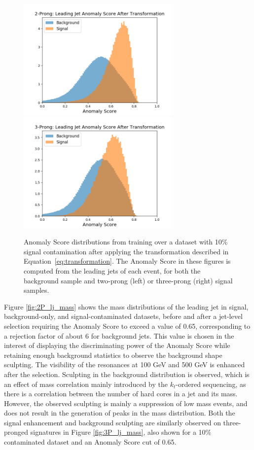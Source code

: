 \documentclass[12pt, a4paper]{article}
\begin{document}
\begin{figure}[H]
	\begin{center}
		\includegraphics[width=225pt]{imgs/bugfix/2Prong_Contaminated_10p0_J_Score_Multi_Lead_SaveForPaper.png}
		\includegraphics[width=225pt]{imgs/bugfix/3Prong_Contaminated_10p0_J_Score_Multi_Lead_SaveForPaper.png}
	\end{center}

	\caption{Anomaly Score distributions from training over a dataset with 10\% signal contamination after applying the transformation described in Equation~\ref{eq:transformation}. The Anomaly Score in these figures is computed from the leading jets of each event, for both the background sample and two-prong (left) or three-prong (right) signal samples.}

	\label{fig:score_transform}
\end{figure}

Figure \ref{fig:2P_lj_mass} shows the mass distributions of the leading jet in signal, background-only, and signal-contaminated datasets, before and after a jet-level selection requiring the Anomaly Score to exceed a value of 0.65, corresponding to a rejection factor of about 6 for background jets.
This value is chosen in the interest of displaying the discriminating power of the Anomaly Score while retaining enough background statistics to observe the background shape sculpting. 
The visibility of the resonances at 100 GeV and 500 GeV is enhanced after the selection. Sculpting in the background distribution is observed, which is an effect of mass correlation mainly introduced by the $k_{t}$-ordered sequencing, as there is a correlation between the number of hard cores in a jet and its mass. However, the observed sculpting is mainly a suppression of low mass events, and does not result in the generation of peaks in the mass distribution. Both the signal enhancement and background sculpting are similarly observed on three-pronged signatures in Figure \ref{fig:3P_lj_mass}, also shown for a 10\% contaminated dataset and an Anomaly Score cut of 0.65.  
\end{document}
